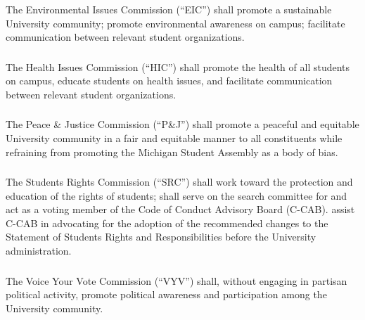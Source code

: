 \subsubsection{}
The Environmental Issues Commission (``EIC'') shall
\subsubsubsection{}
promote a sustainable University community;
\subsubsubsection{}
promote environmental awareness on campus;
\subsubsubsection{}
facilitate communication between relevant student organizations.

\subsubsection{}
The Health Issues Commission (``HIC'') shall promote the health of all students on campus, educate students on health issues, and facilitate communication between relevant student organizations.

\subsubsection{}
The Peace \& Justice Commission (``P\&J'') shall promote a peaceful and equitable University community in a fair and equitable manner to all constituents while refraining from promoting the Michigan Student Assembly as a body of bias.

\subsubsection{}
The Students Rights Commission (``SRC'') shall 
\subsubsubsection{}
work toward the protection and education of the rights of students;
\subsubsubsection{}
shall serve on the search committee for and act as a voting member of the Code of Conduct Advisory Board (C-CAB).
\subsubsubsection{}
assist C-CAB in advocating for the adoption of the recommended changes to the Statement of Students Rights and Responsibilities before the University administration.

\subsubsection{}
The Voice Your Vote Commission (``VYV'') shall, without engaging in partisan political activity, promote political awareness and participation among the University community.
